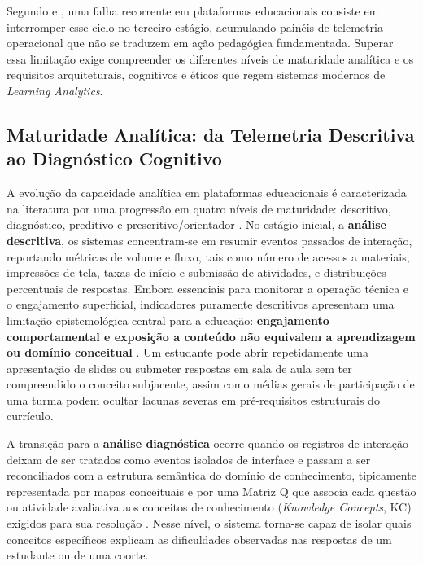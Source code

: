 Segundo  e , uma falha recorrente em plataformas educacionais consiste em interromper esse ciclo no terceiro estágio, acumulando painéis de telemetria operacional que não se traduzem em ação pedagógica fundamentada. Superar essa limitação exige compreender os diferentes níveis de maturidade analítica e os requisitos arquiteturais, cognitivos e éticos que regem sistemas modernos de \textit{Learning Analytics}.

\subsection{Maturidade Analítica: da Telemetria Descritiva ao Diagnóstico Cognitivo}
\label{subsec:maturidade-la}

A evolução da capacidade analítica em plataformas educacionais é caracterizada na literatura por uma progressão em quatro níveis de maturidade: descritivo, diagnóstico, preditivo e prescritivo/orientador \cite{lang_handbook_2017, liao_naviedu_2026}. No estágio inicial, a \textbf{análise descritiva}, os sistemas concentram-se em resumir eventos passados de interação, reportando métricas de volume e fluxo, tais como número de acessos a materiais, impressões de tela, taxas de início e submissão de atividades, e distribuições percentuais de respostas. Embora essenciais para monitorar a operação técnica e o engajamento superficial, indicadores puramente descritivos apresentam uma limitação epistemológica central para a educação: \textbf{engajamento comportamental e exposição a conteúdo não equivalem a aprendizagem ou domínio conceitual} \cite{gaevic_learning_2015}. Um estudante pode abrir repetidamente uma apresentação de slides ou submeter respostas em sala de aula sem ter compreendido o conceito subjacente, assim como médias gerais de participação de uma turma podem ocultar lacunas severas em pré-requisitos estruturais do currículo.

A transição para a \textbf{análise diagnóstica} ocorre quando os registros de interação deixam de ser tratados como eventos isolados de interface e passam a ser reconciliados com a estrutura semântica do domínio de conhecimento, tipicamente representada por mapas conceituais e por uma Matriz Q que associa cada questão ou atividade avaliativa aos conceitos de conhecimento (\textit{Knowledge Concepts}, KC) exigidos para sua resolução \cite{cao_multi-granularity_2025, liu_enhancing_2026}. Nesse nível, o sistema torna-se capaz de isolar quais conceitos específicos explicam as dificuldades observadas nas respostas de um estudante ou de uma coorte.

